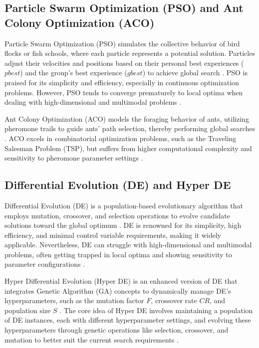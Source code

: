 \documentclass[conference]{IEEEtran}
\begin{document}
\subsection{Particle Swarm Optimization (PSO) and Ant Colony Optimization (ACO)}

Particle Swarm Optimization (PSO) simulates the collective behavior of bird flocks or fish schools, where each particle represents a potential solution. Particles adjust their velocities and positions based on their personal best experiences ($pbest$) and the group's best experience ($gbest$) to achieve global search \cite{kennedy1995particle, storn1997differential}. PSO is praised for its simplicity and efficiency, especially in continuous optimization problems. However, PSO tends to converge prematurely to local optima when dealing with high-dimensional and multimodal problems \cite{eiben1999parameter}.

Ant Colony Optimization (ACO) models the foraging behavior of ants, utilizing pheromone trails to guide ants' path selection, thereby performing global searches \cite{kennedy1995particle, storn1997differential}. ACO excels in combinatorial optimization problems, such as the Traveling Salesman Problem (TSP), but suffers from higher computational complexity and sensitivity to pheromone parameter settings \cite{storn1997differential}.

\subsection{Differential Evolution (DE) and Hyper DE}

Differential Evolution (DE) is a population-based evolutionary algorithm that employs mutation, crossover, and selection operations to evolve candidate solutions toward the global optimum \cite{storn1997differential, eiben1999parameter}. DE is renowned for its simplicity, high efficiency, and minimal control variable requirements, making it widely applicable. Nevertheless, DE can struggle with high-dimensional and multimodal problems, often getting trapped in local optima and showing sensitivity to parameter configurations \cite{storn1997differential, eiben1999parameter}.

Hyper Differential Evolution (Hyper DE) is an enhanced version of DE that integrates Genetic Algorithm (GA) concepts to dynamically manage DE's hyperparameters, such as the mutation factor $F$, crossover rate $CR$, and population size $S$ \cite{burke2013hyper, grobler2010alternative}. The core idea of Hyper DE involves maintaining a population of DE instances, each with different hyperparameter settings, and evolving these hyperparameters through genetic operations like selection, crossover, and mutation to better suit the current search requirements \cite{burke2013hyper, grobler2010alternative}.
\end{document}
